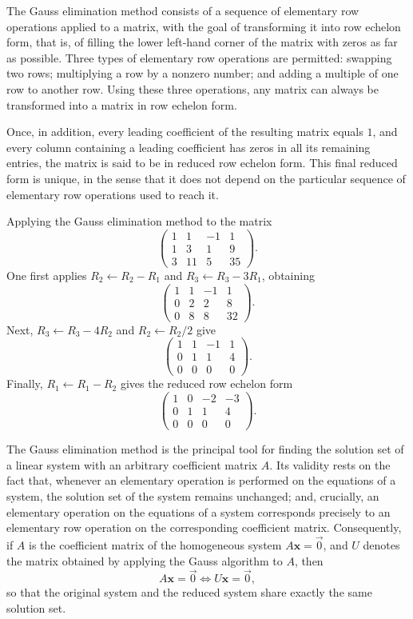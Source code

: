The Gauss elimination method consists of a sequence of elementary row operations applied to a matrix, with the goal of transforming it into row echelon form, that is, of filling the lower left-hand corner of the matrix with zeros as far as possible. Three types of elementary row operations are permitted: swapping two rows; multiplying a row by a nonzero number; and adding a multiple of one row to another row. Using these three operations, any matrix can always be transformed into a matrix in row echelon form.

Once, in addition, every leading coefficient of the resulting matrix equals $1$, and every column containing a leading coefficient has zeros in all its remaining entries, the matrix is said to be in reduced row echelon form. This final reduced form is unique, in the sense that it does not depend on the particular sequence of elementary row operations used to reach it.

\begin{example}
Applying the Gauss elimination method to the matrix
\[
\begin{pmatrix} 1 & 1 & -1 & 1 \\ 1 & 3 & 1 & 9 \\ 3 & 11 & 5 & 35 \end{pmatrix}.
\]
One first applies $R_2\leftarrow R_2-R_1$ and
$R_3\leftarrow R_3-3R_1$, obtaining
\[
\begin{pmatrix} 1 & 1 & -1 & 1 \\ 0 & 2 & 2 & 8 \\ 0 & 8 & 8 & 32 \end{pmatrix}.
\]
Next, $R_3\leftarrow R_3-4R_2$ and $R_2\leftarrow R_2/2$ give
\[
\begin{pmatrix} 1 & 1 & -1 & 1 \\ 0 & 1 & 1 & 4 \\ 0 & 0 & 0 & 0 \end{pmatrix}.
\]
Finally, $R_1\leftarrow R_1-R_2$ gives the reduced row echelon form
\[
\begin{pmatrix} 1 & 0 & -2 & -3 \\ 0 & 1 & 1 & 4 \\ 0 & 0 & 0 & 0 \end{pmatrix}.
\]

\end{example}

The Gauss elimination method is the principal tool for finding the solution set of a linear system with an arbitrary coefficient matrix $A$. Its validity rests on the fact that, whenever an elementary operation is performed on the equations of a system, the solution set of the system remains unchanged; and, crucially, an elementary operation on the equations of a system corresponds precisely to an elementary row operation on the corresponding coefficient matrix. Consequently, if $A$ is the coefficient matrix of the homogeneous system $A\mathbf{x} = \vec{0}$, and $U$ denotes the matrix obtained by applying the Gauss algorithm to $A$, then
\[
A\mathbf{x} = \vec{0} \iff U\mathbf{x} = \vec{0},
\]
so that the original system and the reduced system share exactly the same solution set.

